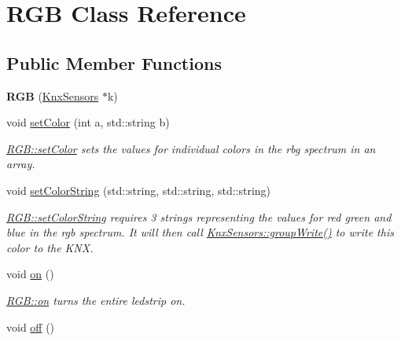 \hypertarget{class_r_g_b}{}\section{R\+G\+B Class Reference}
\label{class_r_g_b}
\subsection*{Public Member Functions}
\begin{DoxyCompactItemize}
\item 
\hypertarget{class_r_g_b_a20a90bc14a1fafd72c43746877fe5801}{}{\bfseries R\+G\+B} (\hyperlink{class_knx_sensors}{Knx\+Sensors} $\ast$k)\label{class_r_g_b_a20a90bc14a1fafd72c43746877fe5801}

\item 
void \hyperlink{class_r_g_b_a0104a87de93066bb7572e4f1be73d97f}{set\+Color} (int a, std\+::string b)
\begin{DoxyCompactList}\small\item\em \hyperlink{class_r_g_b_a0104a87de93066bb7572e4f1be73d97f}{R\+G\+B\+::set\+Color} sets the values for individual colors in the rbg spectrum in an array. \end{DoxyCompactList}\item 
void \hyperlink{class_r_g_b_a945248479249115011175fb520c89d16}{set\+Color\+String} (std\+::string, std\+::string, std\+::string)
\begin{DoxyCompactList}\small\item\em \hyperlink{class_r_g_b_a945248479249115011175fb520c89d16}{R\+G\+B\+::set\+Color\+String} requires 3 strings representing the values for red green and blue in the rgb spectrum. It will then call \hyperlink{class_knx_sensors_abf8b11a2204e9d076a0860f14a1f2cdc}{Knx\+Sensors\+::group\+Write()} to write this color to the K\+N\+X. \end{DoxyCompactList}\item 
\hypertarget{class_r_g_b_af77565f2eae857b144829a9758268b9b}{}void \hyperlink{class_r_g_b_af77565f2eae857b144829a9758268b9b}{on} ()\label{class_r_g_b_af77565f2eae857b144829a9758268b9b}

\begin{DoxyCompactList}\small\item\em \hyperlink{class_r_g_b_af77565f2eae857b144829a9758268b9b}{R\+G\+B\+::on} turns the entire ledstrip on. \end{DoxyCompactList}\item 
\hypertarget{class_r_g_b_a2639dbdcd15af7dcfc1f81970d34f722}{}void \hyperlink{class_r_g_b_a2639dbdcd15af7dcfc1f81970d34f722}{off} ()\label{class_r_g_b_a2639dbdcd15af7dcfc1f81970d34f722}


\end{DoxyCompactItemize}
